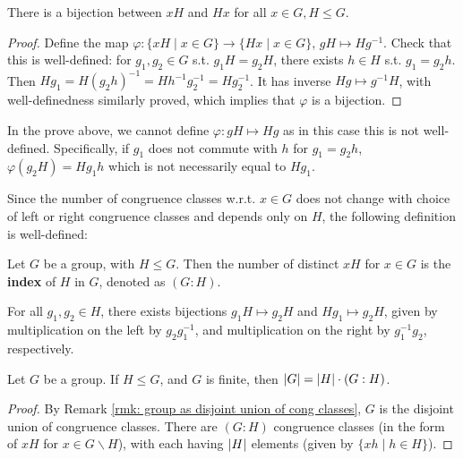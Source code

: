 \documentclass{article}
\begin{document}
\begin{proposition}
    There is a bijection between $xH$ and $Hx$ for all $x \in G, H \leq G$. 
\end{proposition}

\begin{proof}
    Define the map $\varphi: \{xH \mid x \in G\} \to \{Hx \mid x \in G\}$, $gH \mapsto Hg^{-1}$. Check that this is well-defined: for $g_1, g_2 \in G$ s.t. $g_1 H = g_2 H$, there exists $h \in H$ s.t. $g_1 = g_2 h$. Then $Hg_1 = H(g_2 h)^{-1} = Hh^{-1} g_2^{-1} = Hg_2^{-1}$. It has inverse $Hg \mapsto g^{-1}H$, with well-definedness similarly proved, which implies that $\varphi$ is a bijection.
\end{proof}

\begin{remark}
    In the prove above, we cannot define $\varphi: gH \mapsto Hg$ as in this case this is not well-defined. Specifically, if $g_1$ does not commute with $h$ for $g_1 = g_2 h$, $\varphi(g_2 H) = Hg_1 h$ which is not necessarily equal to $H g_1$.
\end{remark}

Since the number of congruence classes w.r.t. $x \in G$ does not change with choice of left or right congruence classes and depends only on $H$, the following definition is well-defined:

\begin{definition}[Index]
    Let $G$ be a group, with $H \leq G$. Then the number of distinct $xH$ for $x \in G$ is the \textbf{index} of $H$ in $G$, denoted as $(G : H)$.
\end{definition}

\begin{remark}
    For all $g_1, g_2 \in H$, there exists bijections $g_1 H \mapsto g_2 H$ and $H g_1 \mapsto g_2 H$, given by multiplication on the left by $g_2 g_1^{-1}$, and multiplication on the right by $g_1^{-1} g_2$, respectively. 
\end{remark}

\begin{theorem}[Lagrange]
    Let $G$ be a group. If $H \leq G$, and $G$ is finite, then $\left|G\right| = \left|H\right| \cdot (G : H)$.
\end{theorem}

\begin{proof}
    By Remark \ref{rmk: group as disjoint union of cong classes}, $G$ is the disjoint union of congruence classes. There are $(G : H)$ congruence classes (in the form of $xH$ for $x \in G \smallsetminus H$), with each having $\left|H\right|$ elements (given by $\{ xh \mid h \in H \}$).
\end{proof}
\end{document}
